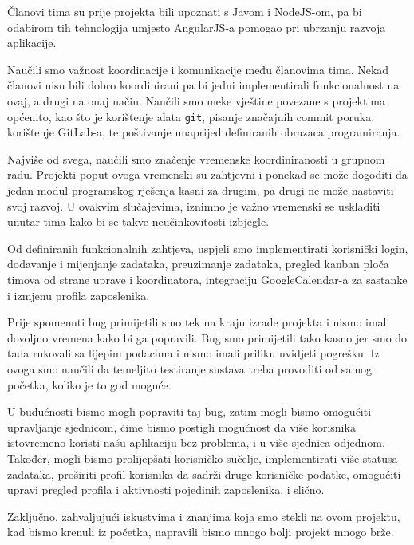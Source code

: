 	Članovi tima su prije projekta bili upoznati s Javom i NodeJS-om, pa bi odabirom tih tehnologija umjesto AngularJS-a pomogao pri ubrzanju razvoja aplikacije. 
	
	Naučili smo važnost koordinacije i komunikacije među članovima tima. Nekad članovi nisu bili dobro koordinirani pa bi jedni implementirali funkcionalnost na ovaj, a drugi na onaj način. Naučili smo meke vještine povezane s projektima općenito, kao što je korištenje alata \texttt{git}, pisanje značajnih commit poruka, korištenje GitLab-a, te poštivanje unaprijed definiranih obrazaca programiranja. 
	
	Najviše od svega, naučili smo značenje vremenske koordiniranosti u grupnom radu. Projekti poput ovoga vremenski su zahtjevni i ponekad se može dogoditi da jedan modul programskog rješenja kasni za drugim, pa drugi ne može nastaviti svoj razvoj. U ovakvim slučajevima, iznimno je važno vremenski se uskladiti unutar tima kako bi se takve neučinkovitosti izbjegle. 
	
	Od definiranih funkcionalnih zahtjeva, uspjeli smo implementirati korisnički login, dodavanje i mijenjanje zadataka, preuzimanje zadataka, pregled kanban ploča timova od strane uprave i koordinatora, integraciju GoogleCalendar-a za sastanke i izmjenu profila zaposlenika.
	
	Prije spomenuti bug primijetili smo tek na kraju izrade projekta i nismo imali dovoljno vremena kako bi ga popravili. Bug smo primijetili tako kasno jer smo do tada rukovali sa lijepim podacima i nismo imali priliku uvidjeti pogrešku. Iz ovoga smo naučili da temeljito testiranje sustava treba provoditi od samog početka, koliko je to god moguće. 
	
	U budućnosti bismo mogli popraviti taj bug, zatim mogli bismo omogućiti upravljanje sjednicom, ćime bismo postigli mogućnost da više korisnika istovremeno koristi našu aplikaciju bez problema, i u više sjednica odjednom. Također, mogli bismo prolijepšati korisničko sučelje, implementirati više statusa zadataka, proširiti profil korisnika da sadrži druge korisničke podatke, omogućiti upravi pregled profila i aktivnosti pojedinih zaposlenika, i slično.

	Zaključno, zahvaljujući iskustvima i znanjima koja smo stekli na ovom projektu, kad bismo krenuli iz početka, napravili bismo mnogo bolji projekt mnogo brže.
	\eject 
